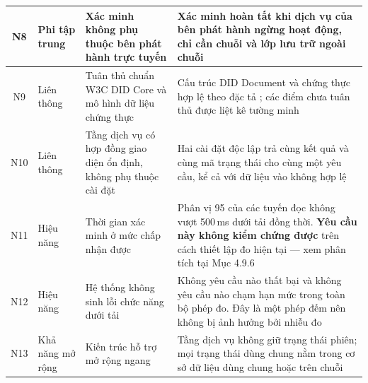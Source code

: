 \begin{longtable}{|c|p{2.6cm}|p{4.6cm}|p{5.4cm}|}
N8 & Phi tập trung &
Xác minh không phụ thuộc bên phát hành trực tuyến &
Xác minh hoàn tất khi dịch vụ của bên phát hành ngừng hoạt động, chỉ cần chuỗi và lớp lưu trữ ngoài chuỗi \\ \hline

N9 & Liên thông &
Tuân thủ chuẩn W3C DID Core và mô hình dữ liệu chứng thực &
Cấu trúc DID Document và chứng thực hợp lệ theo đặc tả \cite{W3C_DIDCore2022, W3C_VCDM2025}; các điểm chưa tuân thủ được liệt kê tường minh \\ \hline

N10 & Liên thông &
Tầng dịch vụ có hợp đồng giao diện ổn định, không phụ thuộc cài đặt &
Hai cài đặt độc lập trả cùng kết quả và cùng mã trạng thái cho cùng một yêu cầu, kể cả với dữ liệu vào không hợp lệ \\ \hline

N11 & Hiệu năng &
Thời gian xác minh ở mức chấp nhận được &
Phân vị 95 của các tuyến đọc không vượt 500\,ms dưới tải đồng thời. \textbf{Yêu cầu này không kiểm chứng được} trên cách thiết lập đo hiện tại --- xem phân tích tại Mục 4.9.6 \\ \hline

N12 & Hiệu năng &
Hệ thống không sinh lỗi chức năng dưới tải &
Không yêu cầu nào thất bại và không yêu cầu nào chạm hạn mức trong toàn bộ phép đo. Đây là một phép đếm nên không bị ảnh hưởng bởi nhiễu đo \\ \hline

N13 & Khả năng mở rộng &
Kiến trúc hỗ trợ mở rộng ngang &
Tầng dịch vụ không giữ trạng thái phiên; mọi trạng thái dùng chung nằm trong cơ sở dữ liệu dùng chung hoặc trên chuỗi \\ \hline

\end{longtable}
